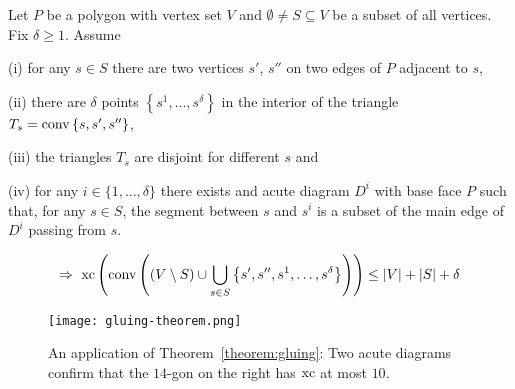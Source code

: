 \begin{theorem}\label{theorem:gluing}
  Let $P$ be a polygon with vertex set $V$ and $\emptyset \neq S \subseteq V$ be a subset of all vertices. Fix $\delta \geq 1$. Assume

  (i) for any $s \in S$ there are two vertices $s'$, $s''$ on two edges of $P$ adjacent to $s$,

  (ii) there are $\delta$ points $\left\{s^1, \dots, s^\delta \right\}$ in the interior of the triangle ${T_s = \operatorname{conv} \left\{s,s',s''\right\}}$,

  (iii) the triangles $T_s$ are disjoint for different $s$ and

  (iv) for any $i \in \{1,\dots,\delta\}$ there exists and acute diagram $D^i$ with base face $P$ such that, for any $s \in S$, the segment between $s$ and $s^i$ is a subset of the main edge of $D^i$ passing from $s$.

  $$\Rightarrow \ \operatorname{xc}\left( \operatorname{conv}\left( (V \setminus S) \cup \bigcup_{s \in S} \left\{ s',s'',s^1,\dots,s^\delta \right\}  \right) \right) \leq \lvert V\rvert + \lvert S\rvert + \delta$$
\end{theorem}

\begin{figure}[ht]
  \centering
  \texttt{[image: gluing-theorem.png]}
  \caption{An application of Theorem~\ref{theorem:gluing}: Two acute diagrams confirm that the $14$-gon on the right has $\operatorname{xc}$ at most $10$. \cite[Figure 3]{shitov2020sublinear}}
  \label{fig:gluing-theorem}
\end{figure}

